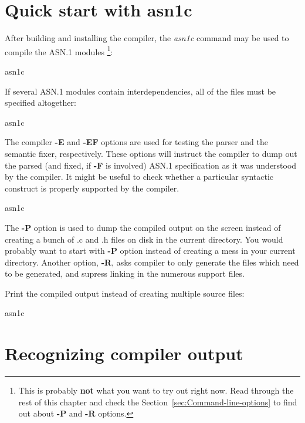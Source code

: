 \documentclass[english,oneside,12pt]{book}
\begin{document}
\section{Quick start with asn1c}

After building and installing the compiler, the \emph{asn1c}
command may be used to compile the ASN.1 modules%
\footnote{This is probably \textbf{not} what you want to try out right now. Read through the rest of this chapter and check the Section~\ref{sec:Command-line-options}
to find out about \textbf{-P} and \textbf{-R} options.%
}:
\begin{bash}
asn1c %
\end{bash}
If several ASN.1 modules contain interdependencies, all of the files
must be specified altogether:
\begin{bash}
asn1c %
\end{bash}
The compiler \textbf{-E} and \textbf{-EF} options are used for testing
the parser and the semantic fixer, respectively. These options will
instruct the compiler to dump out the parsed (and fixed, if \textbf{-F}
is involved) ASN.1 specification as it was understood
by the compiler. It might be useful to check whether a particular
syntactic construct is properly supported by the compiler.
\begin{bash}
asn1c %
\end{bash}
The \textbf{-P} option is used to dump the compiled output on the
screen instead of creating a bunch of .c and .h files on disk in the
current directory. You would probably want to start with \textbf{-P}
option instead of creating a mess in your current directory. Another
option, \textbf{-R}, asks compiler to only generate the files which
need to be generated, and supress linking in the numerous support
files.

Print the compiled output instead of creating multiple source files:
\begin{bash}
asn1c %
\end{bash}

\clearpage{}
\section{Recognizing compiler output}
\end{document}
